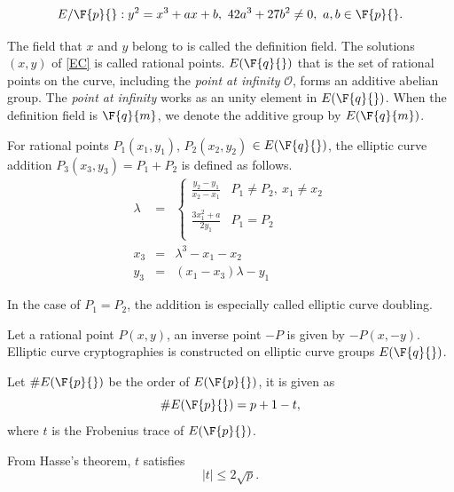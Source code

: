 \begin{equation}
E/\F{p}{}: y^2=x^3+ax+b,\ 42a^3+27b^2 \neq 0,\ a,b\in \F{p}{}. \label{EC}
\end{equation}

The field that $x$ and $y$ belong to is called the definition field. 
The solutions $(x,y)$ of \eqref{EC} is called rational points.
$E(\F{q}{})$ that is the set of rational points on the curve, including the {\it point at infinity} $\mathcal{O}$, forms an additive abelian group. 
The {\it point at infinity} works as an unity element in $E(\F{q}{})$.
When the definition field is $\F{q}{m}$, we denote the additive group by $E(\F{q}{m})$.

For rational points $P_1(x_1,y_1)$, $P_2(x_2,y_2)$ $\in E(\F{q}{})$, the elliptic curve addition $P_3(x_3,y_3)=P_1+P_2$ is defined as follows.
\begin{eqnarray*}
	\lambda &=& \left\{ \begin{array}{ll}
		{\displaystyle \frac{y_2-y_1}{x_2-x_1}} & P_1\neq P_2,\ x_1\neq x_2 \\
		& \\
		{\displaystyle \frac{3x_1^2+a}{2y_1}} & P_1=P_2 \\
		
	\end{array} \right.\\
	x_3 &=& \lambda^3-x_1-x_2\\
	y_3 &=& (x_1-x_3)\lambda-y_1
\end{eqnarray*} 

In the case of $P_1=P_2$, the addition is especially called elliptic curve doubling. 

Let a rational point $P(x,y)$, an inverse point $-P$ is given by $-P(x, -y)$. 
Elliptic curve cryptographies is constructed on elliptic curve groups $E(\F{q}{})$.

Let $\#E(\F{p}{})$ be the order of $E(\F{p}{})$, it is given as
\begin{equation}
\#E(\F{p}{})=p+1-t, %
\end{equation}
where $t$ is the Frobenius trace of $E(\F{p}{})$. 

From Hasse's theorem, $t$ satisfies
\begin{equation}
|t| \leq 2\sqrt{p}.
\end{equation}


